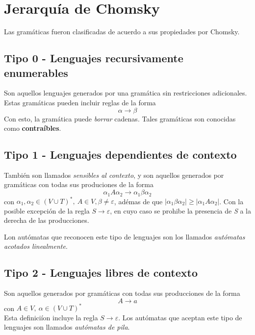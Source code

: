 \section{Jerarquía de Chomsky}
Las gramáticas fueron clasificadas de acuerdo a sus propiedades por Chomsky.

\subsection{Tipo 0 - Lenguajes recursivamente enumerables}

Son aquellos lenguajes generados por una gramática sin restricciones adicionales. Estas gramáticas pueden incluir reglas de la forma 
\[\alpha \rightarrow \beta\]
Con esto, la gramática puede \textit{borrar} cadenas. Tales gramáticas son conocidas como \textbf{contraíbles}.


\subsection{Tipo 1 - Lenguajes dependientes de contexto}
También son llamados \textit{sensibles al contexto}, y son aquellos generados por gramáticas con todas sus produciones de la forma
\[\alpha_1 A \alpha_2 \rightarrow \alpha_1 \beta \alpha_2\]
con $\alpha_1, \alpha_2 \in (V \cup T)^*,~ A \in V, \beta \neq \varepsilon$, adémas de que $| \alpha_1 \beta \alpha_2 | \ge |\alpha_1 A \alpha_2|$. Con la posible excepción de la regla $S \rightarrow \varepsilon$, en cuyo caso se prohibe la presencia de \textit{S} a la derecha de las producciones.

\newpara

Lon autómatas que reconocen este tipo de lenguajes son los llamados \textit{autómatas acotados linealmente}.


\subsection{Tipo 2 - Lenguajes libres de contexto}
Son aquellos generados por gramáticas con todas sus producciones de la forma 
\[A \rightarrow a\]
con $A \in V,~ \alpha \in (V \cup T)^*$\\
Esta definiciíon incluye la regla $S \rightarrow \varepsilon$. Los autómatas que aceptan este tipo de lenguajes son llamados \textit{autómatas de pila}.

